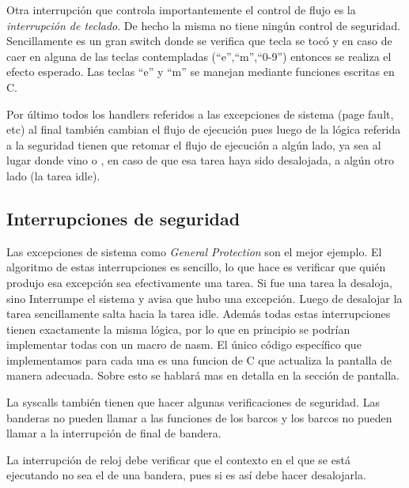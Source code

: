 	Otra interrupción que controla importantemente el control de
flujo es la \emph{interrupción de teclado}. De hecho la misma no tiene
ningún control de seguridad. Sencillamente es un gran switch
donde se verifica que tecla se tocó y en caso de caer en alguna
de las teclas contempladas (``e'',``m'',``0-9'') entonces
se realiza el efecto esperado. Las teclas ``e'' y ``m'' se
manejan mediante funciones escritas en C.

	Por último todos los handlers referidos a las excepciones de
sistema (page fault, etc) al final también cambian el flujo de ejecución
pues luego de la lógica referida a la seguridad tienen que retomar
el flujo de ejecución a algún lado, ya sea al lugar donde vino o
, en caso de que esa tarea haya sido desalojada, a algún otro lado
(la tarea idle).

\subsection{Interrupciones de seguridad}

	Las excepciones de sistema como \textit{General Protection}
son el mejor ejemplo. El algoritmo de estas interrupciones es
sencillo, lo que hace es verificar que quién produjo
esa excepción sea efectivamente una tarea. Si fue una tarea la desaloja, 
sino Interrumpe el sistema y avisa que hubo una excepción. Luego
de desalojar la tarea sencillamente salta hacia la tarea idle. Además
todas estas interrupciones tienen exactamente la misma lógica, por lo
que en principio se podrían implementar todas con un macro de nasm.
El único código específico que implementamos para cada una es una funcion de C
que actualiza la pantalla de manera adecuada. Sobre esto se hablará
mas en detalla en la sección de pantalla.

	La syscalls también tienen que hacer algunas verificaciones de
seguridad. Las banderas no pueden llamar a las funciones de los barcos
y los barcos no pueden llamar a la interrupción de final de bandera.

	La interrupción de reloj debe verificar que el contexto en el
que se está ejecutando no sea el de una bandera, pues si es así
debe hacer desalojarla. 



